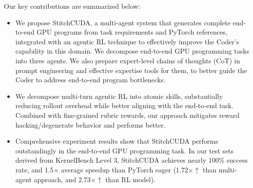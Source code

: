 Our key contributions are summarized below:
\begin{itemize}

\vspace{-0.2cm}
    \item We propose StitchCUDA, a multi-agent system that generates complete end-to-end GPU programs from task requirements and PyTorch references, integrated with an agentic RL technique to effectively improve the Coder's capability in this domain. We decompose end-to-end GPU programming tasks into three agents. We also prepare expert-level chains of thoughts (CoT) in prompt engineering and effective expertise tools for them, to better guide the Coder to address end-to-end program bottlenecks.   

    \vspace{-0.2cm}
    \item We decompose multi-turn agentic RL into atomic skills, substantially reducing rollout overhead while better aligning with the end-to-end task. Combined with fine-grained rubric rewards, our approach mitigates reward hacking/degenerate behavior and performs better.

    \vspace{-0.2cm}
    \item Comprehensive experiment results show that StitchCUDA performs outstandingly in the end-to-end GPU programming task. In our test sets derived from KernelBench Level 3, StitchCUDA achieves nearly 100\% success rate, and 1.5$\times$ average speedup than PyTorch eager (1.72$\times$$\uparrow$ than multi-agent approach, and 2.73$\times$$\uparrow$ than RL model).  
    
\end{itemize}

